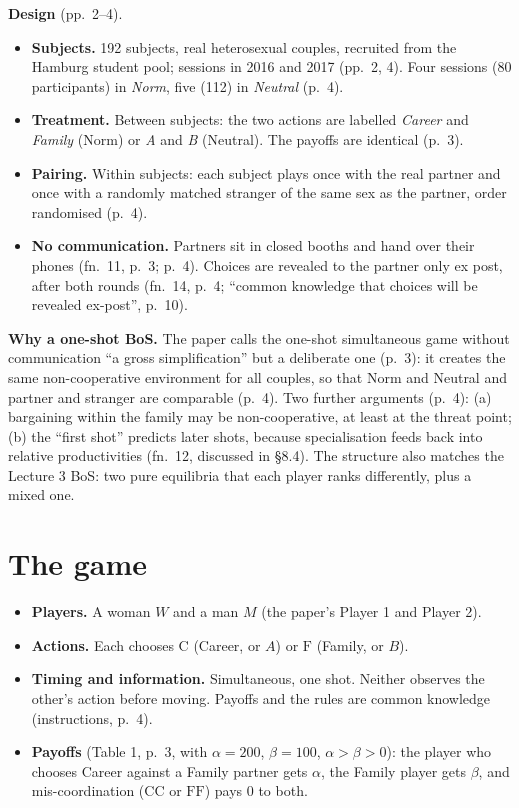 \documentclass[11pt,a4paper]{article}
\newcommand{\C}{\mathrm{C}}
\newcommand{\Fm}{\mathrm{F}}
\begin{document}
\textbf{Design} (pp.~2--4).
\begin{itemize}
  \item \textbf{Subjects.} 192 subjects, real heterosexual couples, recruited from the Hamburg
    student pool; sessions in 2016 and 2017 (pp.~2, 4). Four sessions (80 participants) in
    \emph{Norm}, five (112) in \emph{Neutral} (p.~4).
  \item \textbf{Treatment.} Between subjects: the two actions are labelled \emph{Career} and
    \emph{Family} (Norm) or \emph{A} and \emph{B} (Neutral). The payoffs are identical (p.~3).
  \item \textbf{Pairing.} Within subjects: each subject plays once with the real partner and once
    with a randomly matched stranger of the same sex as the partner, order randomised (p.~4).
  \item \textbf{No communication.} Partners sit in closed booths and hand over their phones
    (fn.~11, p.~3; p.~4). Choices are revealed to the partner only ex post, after both rounds
    (fn.~14, p.~4; ``common knowledge that choices will be revealed ex-post'', p.~10).
\end{itemize}

\textbf{Why a one-shot BoS.} The paper calls the one-shot simultaneous game without communication
``a gross simplification'' but a deliberate one (p.~3): it creates the same non-cooperative
environment for all couples, so that Norm and Neutral and partner and stranger are comparable
(p.~4). Two further arguments (p.~4): (a) bargaining within the family may be non-cooperative, at
least at the threat point; (b) the ``first shot'' predicts later shots, because specialisation
feeds back into relative productivities (fn.~12, discussed in \S8.4). The structure also matches
the Lecture 3 BoS: two pure equilibria that each player ranks differently, plus a mixed one.

\section{The game}

\begin{itemize}
  \item \textbf{Players.} A woman $W$ and a man $M$ (the paper's Player 1 and Player 2).
  \item \textbf{Actions.} Each chooses $\C$ (Career, or $A$) or $\Fm$ (Family, or $B$).
  \item \textbf{Timing and information.} Simultaneous, one shot. Neither observes the other's
    action before moving. Payoffs and the rules are common knowledge (instructions, p.~4).
  \item \textbf{Payoffs} (Table 1, p.~3, with $\alpha=200$, $\beta=100$, $\alpha>\beta>0$): the
    player who chooses Career against a Family partner gets $\alpha$, the Family player gets
    $\beta$, and mis-coordination ($\C\C$ or $\Fm\Fm$) pays $0$ to both.
\end{itemize}
\end{document}

